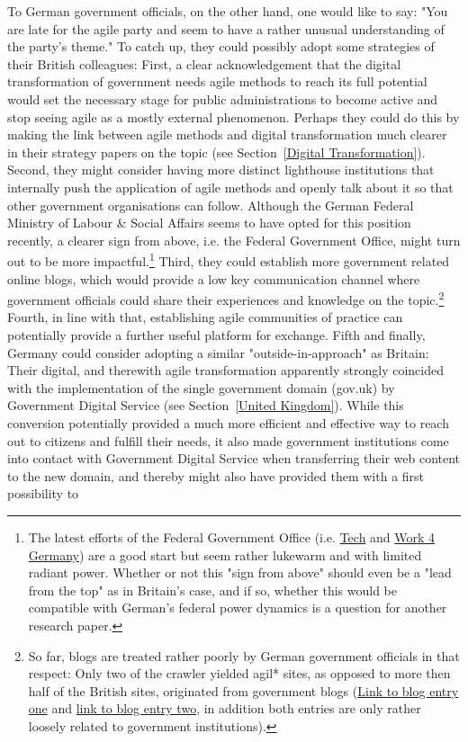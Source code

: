 To German government officials, on the other hand, one would like to say: "You are late for the agile party and seem to have a rather unusual understanding of the party's theme." To catch up, they could possibly adopt some strategies of their British colleagues: First, a clear acknowledgement that the digital transformation of government needs agile methods to reach its full potential would set the necessary stage for public administrations to become active and stop seeing agile as a mostly external phenomenon. Perhaps they could do this by making the link between agile methods and digital transformation much clearer in their strategy papers on the topic (see Section~\ref{Digital Transformation}). Second, they might consider having more distinct lighthouse institutions that internally push the application of agile methods and openly talk about it so that other government organisations can follow. Although the German Federal Ministry of Labour \& Social Affairs seems to have opted for this position recently, a clearer sign from above, i.e. the Federal Government Office, might turn out to be more impactful.\footnote{The latest efforts of the Federal Government Office (i.e. \href{https://tech.4germany.org/}{Tech} and \href{https://work.4germany.org/}{Work 4 Germany}) are a good start but seem rather lukewarm and with limited radiant power. Whether or not this "sign from above" should even be a "lead from the top" as in Britain's case, and if so, whether this would be compatible with German's federal power dynamics is a question for another research paper.} Third, they could establish more government related online blogs, which would provide a low key communication channel where government officials could share their experiences and knowledge on the topic.\footnote{So far, blogs are treated rather poorly by German government officials in that respect: Only two of the crawler yielded agil* sites, as opposed to more then half of the British sites, originated from government blogs (\href{https://mb.sachsen-anhalt.de/start/blog-detailansicht/?cHash=76b9e1e8417e5e36ae5105ad14afa4f2&tx_t3extblog_blogsystem\%5Baction\%5D=show&tx_t3extblog_blogsystem\%5Bday\%5D=23&tx_t3extblog_blogsystem\%5Bmonth\%5D=06&tx_t3extblog_blogsystem\%5Bpost\%5D=267&tx_t3extblog_blogsystem\%5Byear\%5D=2018}{Link to blog entry one} and \href{https://frauenseiten.bremen.de/blog/internationales-sommerstudium-informatica-feminale/}{link to blog entry two}, in addition both entries are only rather loosely related to government institutions).} Fourth, in line with that, establishing agile communities of practice can potentially provide a further useful platform for exchange. Fifth and finally, Germany could consider adopting a similar "outside-in-approach" as Britain: Their digital, and therewith agile transformation apparently strongly coincided with the implementation of the single government domain (gov.uk) by Government Digital Service (see Section~\ref{United Kingdom}). While this conversion potentially provided a much more efficient and effective way to reach out to citizens and fulfill their needs, it also made government institutions come into contact with Government Digital Service when transferring their web content to the new domain, and thereby might also have provided them with a first possibility to 